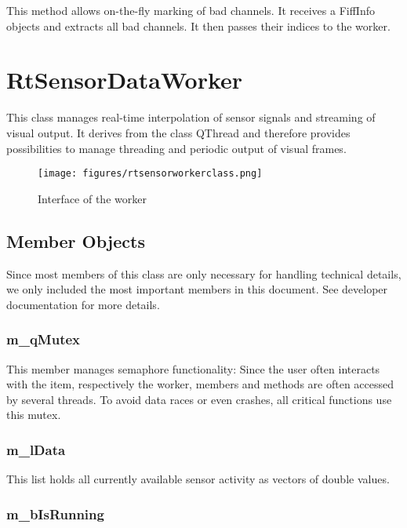 This method allows on-the-fly marking of bad channels. It receives a FiffInfo objects and extracts all bad channels. It then passes their indices to the worker.

\clearpage

\section{RtSensorDataWorker}

This class manages real-time interpolation of sensor signals and streaming of visual output.
It derives from the class QThread and therefore provides possibilities to manage threading and periodic output of visual frames.

\begin{figure}[h]
	\begin{center}
		\texttt{[image: figures/rtsensorworkerclass.png]}
		\caption{Interface of the worker}
	\end{center}
\end{figure}

\subsection{Member Objects}

Since most members of this class are only necessary for handling technical details, we only included the most important members in this document. See developer documentation for more details.

\subsubsection{m\_qMutex}

This member manages semaphore functionality: Since the user often interacts with the item, respectively the worker, members and methods are often accessed by several threads. To avoid data races or even crashes, all critical functions use this mutex.

\subsubsection{m\_lData}

This list holds all currently available sensor activity as vectors of double values.

\subsubsection{m\_bIsRunning}

